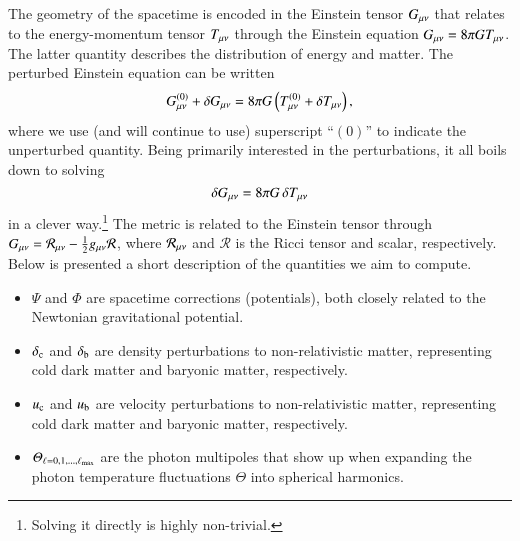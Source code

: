 



The geometry of the spacetime is encoded in the Einstein tensor $G_{\mu \nu}$ that relates to the energy-momentum tensor $T_{\mu \nu}$ through the Einstein equation $G_{\mu \nu} = 8\pi G T_{\mu \nu}$. The latter quantity describes the distribution of energy and matter. The perturbed Einstein equation can be written
\begin{equation}
    G^{(0)}_{\mu \nu} +\delta G_{\mu \nu} = 8\pi G \left( T^{(0)}_{\mu \nu}+\delta T_{\mu \nu} \right),
\end{equation}
where we use (and will continue to use) superscript ``$(0)$'' to indicate the unperturbed quantity. Being primarily interested in the perturbations, it all boils down to solving
\begin{equation}\label{mil3:theo:eq:delta_G}
    \delta G_{\mu \nu} = 8\pi G\, \delta T_{\mu \nu}
\end{equation}
in a clever way.\footnote{Solving it directly is highly non-trivial.} The metric is related to the Einstein tensor through $G_{\mu \nu}= \mathcal{R}_{\mu \nu} - \frac{1}{2}g_{\mu \nu} \mathcal{R}$, where $\mathcal{R}_{\mu \nu}$ and $\mathcal{R}$ is the Ricci tensor and scalar, respectively. 
Below is presented a short description of the quantities we aim to compute. 
\begin{itemize}
    \item $\Psi$ and $\Phi$ are spacetime corrections (potentials), both closely related to the Newtonian gravitational potential.
    \item $\delta_\mathrm{c}$ and $\delta_\mathrm{b}$ are density perturbations to non-relativistic matter, representing cold dark matter and baryonic matter, respectively.
    \item $u_\mathrm{c}$ and $u_\mathrm{b}$ are velocity perturbations to non-relativistic matter, representing cold dark matter and baryonic matter, respectively.
    \item $\varTheta_{\ell= 0, 1, \dots, \ell_\mathrm{max}}$ are the photon multipoles that show up when expanding the photon temperature fluctuations $\Theta$ into spherical harmonics.
\end{itemize}

